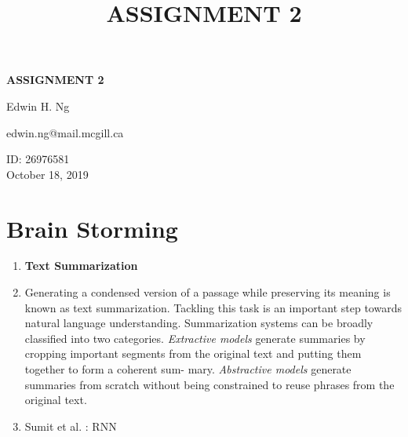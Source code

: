 \documentclass[12pt,a4paper]{report}
\begin{document}
\title{ASSIGNMENT 2\\
}


\setcounter{page}{1}
\thispagestyle{empty} 
\begin{titlepage}

    \begin{center}
        \vspace*{0.7cm}
         \Huge
        \textbf{ASSIGNMENT 2}
  
        \vspace{2cm}
          \Large
          Edwin H. Ng
                
        \vspace{2cm}
        
        edwin.ng@mail.mcgill.ca
                
        \vspace{2cm}

        \Large
        ID: 26976581\\
           \vspace{10cm}
        October 18, 2019\\
        \vspace{2cm}    
    \end{center}
\end{titlepage}


\chapter*{Brain Storming}
\begin{enumerate}
\item \textbf{Text Summarization}
\item Generating a condensed version of a passage while preserving its meaning is known as text summarization. Tackling this task is an important step towards natural language understanding. Summarization systems can be broadly classified into two categories. \textit{Extractive models} generate summaries by cropping important segments from the original text and putting them together to form a coherent sum- mary. \textit{Abstractive models} generate summaries from scratch without being constrained to reuse phrases from the original text.
\item Sumit et al. : RNN
\end{enumerate}
\end{document}
